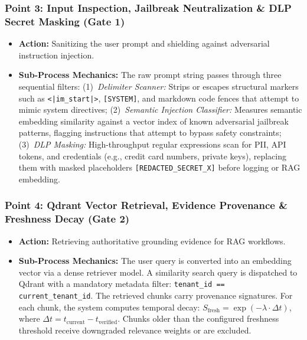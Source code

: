 \documentclass[11pt,a4paper]{article}
\begin{document}
\subsubsection*{Point 3: Input Inspection, Jailbreak Neutralization \& DLP Secret Masking (Gate 1)}
\begin{itemize}[leftmargin=*,itemsep=1pt]
  \item \textbf{Action:} Sanitizing the user prompt and shielding against adversarial instruction injection.
  \item \textbf{Sub-Process Mechanics:} The raw prompt string passes through three sequential filters:
    (1)~\emph{Delimiter Scanner:} Strips or escapes structural markers such as \texttt{<|im\_start|>}, \texttt{[SYSTEM]}, and markdown code fences that attempt to mimic system directives;
    (2)~\emph{Semantic Injection Classifier:} Measures semantic embedding similarity against a vector index of known adversarial jailbreak patterns, flagging instructions that attempt to bypass safety constraints;
    (3)~\emph{DLP Masking:} High-throughput regular expressions scan for PII, API tokens, and credentials (e.g., credit card numbers, private keys), replacing them with masked placeholders \texttt{[REDACTED\_SECRET\_X]} before logging or RAG embedding.
\end{itemize}

\subsubsection*{Point 4: Qdrant Vector Retrieval, Evidence Provenance \& Freshness Decay (Gate 2)}
\begin{itemize}[leftmargin=*,itemsep=1pt]
  \item \textbf{Action:} Retrieving authoritative grounding evidence for RAG workflows.
  \item \textbf{Sub-Process Mechanics:} The user query is converted into an embedding vector via a dense retriever model. A similarity search query is dispatched to Qdrant with a mandatory metadata filter: \texttt{tenant\_id == current\_tenant\_id}. The retrieved chunks carry provenance signatures. For each chunk, the system computes temporal decay: $S_{\text{fresh}} = \exp(-\lambda \cdot \Delta t)$, where $\Delta t = t_{\text{current}} - t_{\text{verified}}$. Chunks older than the configured freshness threshold receive downgraded relevance weights or are excluded.
\end{itemize}
\end{document}
